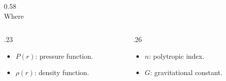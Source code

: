 \begin{frame}
\begin{columns}[c]
\begin{column}{0.58\textwidth}
\begin{equation*}
            \end{equation*}
            Where
            \begin{columns}
                \begin{column}{.23\paperwidth}
                    \begin{itemize}
                        \item $P\left(r\right)$: pressure function.
                        \item $\rho\left(r\right)$: density function.
                    \end{itemize}
                \end{column}
                \begin{column}{.26\paperwidth}
                    \begin{itemize}
                        \item $n$: polytropic index. %
                        \item $G$: gravitational constant.
                    \end{itemize}
                \end{column}
            \end{columns}
        \end{column}
    \end{columns}
\end{frame}
